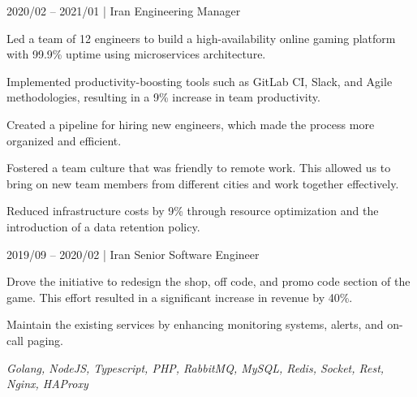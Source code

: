     \begin{onecolentry}
    \end{onecolentry}
    \begin{twocolentry}{2020/02 -- 2021/01 | Iran}
        Engineering Manager
    \end{twocolentry}
    \begin{onecolentry}
        \begin{highlights}
            \item Led a team of 12 engineers to build a high-availability online gaming platform with 99.9\% uptime using microservices architecture.
            \item Implemented productivity-boosting tools such as GitLab CI, Slack, and Agile methodologies, resulting in a 9\% increase in team productivity.
            \item Created a pipeline for hiring new engineers, which made the process more organized and efficient.
            \item Fostered a team culture that was friendly to remote work. This allowed us to bring on new team members from different cities and work together effectively.
            \item Reduced infrastructure costs by 9\% through resource optimization and the introduction of a data retention policy.
        \end{highlights}
    \end{onecolentry}
    \begin{twocolentry}{2019/09 -- 2020/02 | Iran}
        Senior Software Engineer
    \end{twocolentry}
    \begin{onecolentry}
        \begin{highlights}
            \item Drove the initiative to redesign the shop, off code, and promo code section of the game. This effort resulted in a significant increase in revenue by 40\%.
            \item Maintain the existing services by enhancing monitoring systems, alerts, and on-call paging.
        \end{highlights}
        \textit{Golang, NodeJS, Typescript, PHP, RabbitMQ, MySQL, Redis, Socket, Rest, Nginx, HAProxy}
    \end{onecolentry}
    \vspace{0.3cm}


